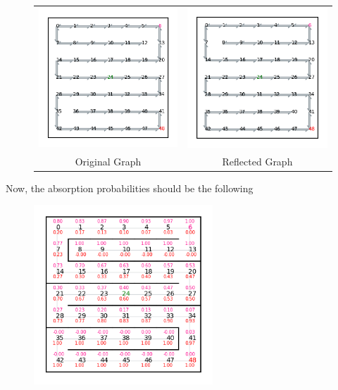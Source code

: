 \begin{figure}[H]
    \begin{tabular}{cc}
      \includegraphics[width=70mm]{../pictures/216-4.png} &   \includegraphics[width=70mm]{../pictures/inv-4.png} \\
    Original Graph & Reflected Graph \\[6pt]
    \end{tabular}
\end{figure}

Now, the absorption probabilities should be the following

\begin{figure}[H]
    \centering
    \includegraphics[width=0.6\textwidth]{../pictures/inv-3.png}
\end{figure}

